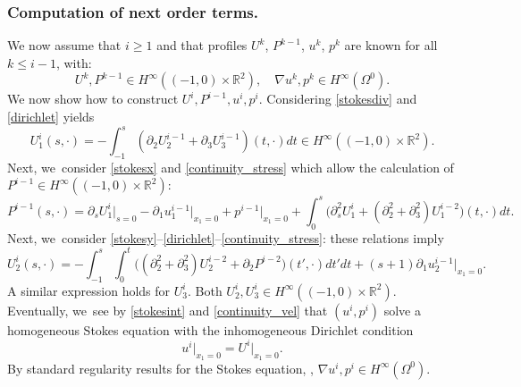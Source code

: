 \documentclass[10pt]{amsart}
\theoremstyle{plain}
\theoremstyle{definition}
\let\pa\partial
\let\na\nabla
\newcommand{\R}{\mathbb{R}}
\begin{document}
\subsubsection*{Computation of next order terms.} We now assume that $i \ge 1$ and that profiles $U^k$, $P^{k-1}$, $u^k$, $p^k$ are known for all $k \le i-1$, with:
\[
U^k, P^{k-1} \in H^\infty((-1,0) \times \R^2), \quad \na u^k, p^k \in H^\infty(\Omega^0).
\]
We now show how to construct $U^i,P^{i-1}, u^i, p^i$. Considering \eqref{stokesdiv} and \eqref{dirichlet} yields
\[
U^i_1(s,\cdot) = - \int_{-1}^s (\pa_2 U^{i-1}_2 + \pa_3 U^{i-1}_3)(t,\cdot) dt \in H^\infty((-1,0) \times \R^2).
\]
Next, we~consider \eqref{stokesx} and \eqref{continuity_stress} which allow the calculation of \hbox{$P^{i-1} \!\!\in\! H^\infty(\!({-}1,0)\!\times\! \R^2)$}:
\[
P^{i-1}(s,\cdot) = \pa_s U^i_1\vert_{s=0} - \pa_1 u^{i-1}_1\vert_{x_1=0} + p^{i-1}\vert_{x_1=0}
+ \int_0^s \big(\pa^2_s U^i_1 + (\pa^2_2 + \pa^2_3) U^{i-2}_1 \big)(t,\cdot) dt.
\]
Next, we~consider \eqref{stokesy}--\eqref{dirichlet}--\eqref{continuity_stress}: these relations imply
\[
U^i_2(s,\cdot) = - \int_{-1}^s \int_{0}^t \Big((\pa^2_2 + \pa^2_3) U^{i-2}_2 + \pa_2 P^{i-2} \Big)(t',\cdot) dt' dt + (s+1) \pa_1 u^{i-1}_2\vert_{x_1=0}.
\]
A similar expression holds for $U^i_3$. Both $U^i_2, U^i_3 \in H^\infty((-1,0) \times \R^2)$. Eventually, we~see by \eqref{stokesint} and \eqref{continuity_vel} that $(u^i,p^i)$ solve a homogeneous Stokes equation with the inhomogeneous Dirichlet condition
\[
u^i\vert_{x_1=0} = U^i\vert_{x_1=0}.
\]
By standard regularity results for the Stokes equation, \cf
\cite[Th.\,IV.3.2 \& IV.3.3]{Galdi}, $\na u^i, p^i \in H^\infty(\Omega^0)$.
\end{document}
